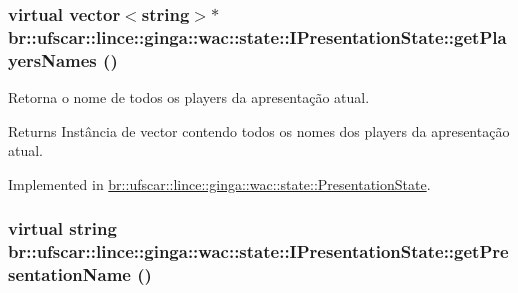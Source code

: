 \hypertarget{classbr_1_1ufscar_1_1lince_1_1ginga_1_1wac_1_1state_1_1IPresentationState_ac3ba6e82191af041b1bc4320ddaf0ca5}{
\subsubsection[{getPlayersNames}]{\setlength{\rightskip}{0pt plus 5cm}virtual vector$<$string$>$$\ast$ br::ufscar::lince::ginga::wac::state::IPresentationState::getPlayersNames ()}}
\label{classbr_1_1ufscar_1_1lince_1_1ginga_1_1wac_1_1state_1_1IPresentationState_ac3ba6e82191af041b1bc4320ddaf0ca5}


Retorna o nome de todos os players da apresentação atual. 

\begin{DoxyReturn}{Returns}
Instância de vector contendo todos os nomes dos players da apresentação atual. 
\end{DoxyReturn}


Implemented in \hyperlink{classbr_1_1ufscar_1_1lince_1_1ginga_1_1wac_1_1state_1_1PresentationState_a82bc0879c2e2d6c6eb48ffaeee043bac}{br::ufscar::lince::ginga::wac::state::PresentationState}.

\hypertarget{classbr_1_1ufscar_1_1lince_1_1ginga_1_1wac_1_1state_1_1IPresentationState_a939e322cd15e49680f227bfc6b9ded9d}{
\subsubsection[{getPresentationName}]{\setlength{\rightskip}{0pt plus 5cm}virtual string br::ufscar::lince::ginga::wac::state::IPresentationState::getPresentationName ()}}
\label{classbr_1_1ufscar_1_1lince_1_1ginga_1_1wac_1_1state_1_1IPresentationState_a939e322cd15e49680f227bfc6b9ded9d}


